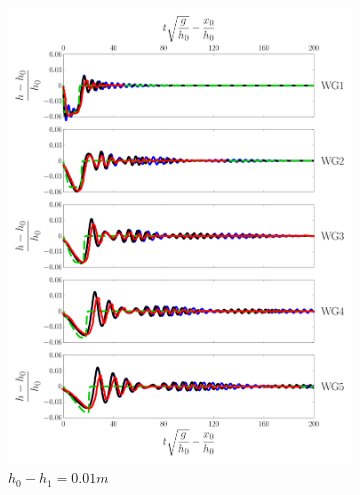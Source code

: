\documentclass[10pt]{elsarticle}
\begin{document}
{\begin{figure}
	\begin{adjustbox}{minipage=\fboxrule,bgcolor=pink,frame}
	\centering
	\begin{subfigure}{0.49\textwidth}
		\centering
		\includegraphics[width=\textwidth]{Figure-11a.pdf}
		\caption{$h_0 - h_1 = 0.01m$}
		\label{Fig:Neg_Wave_1}
	\end{subfigure}
	\begin{subfigure}{0.49\textwidth}
		\centering

\end{subfigure}
\end{adjustbox}
\end{figure}}
\end{document}
